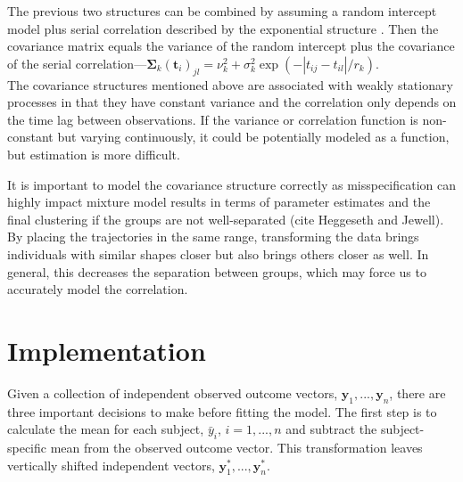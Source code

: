 \documentclass[12pt]{article}
\newcommand{\B}[0]{\mathbf}
\begin{document}
The previous two structures can be combined by assuming a random intercept model plus serial correlation described by the exponential structure \cite{diggle2002}. Then the covariance matrix equals the variance of the random intercept plus the covariance of the serial correlation---$\B \Sigma_{k}(\B t_{i})_{jl}=\nu^{2}_{k}+\sigma_{k}^{2}\exp(-| t_{ij}-t_{il}| / r_{k})$.\\

The covariance structures mentioned above are associated with weakly stationary processes in that they have constant variance and the correlation only depends on the time lag between observations. If the variance or correlation function is non-constant but varying continuously, it could be potentially modeled as a function, but estimation is more difficult.

It is important to model the covariance structure correctly as misspecification can highly impact mixture model results in terms of parameter estimates and the final clustering if the groups are not well-separated (cite Heggeseth and Jewell). By placing the trajectories in the same range, transforming the data brings individuals with similar shapes closer but also brings others closer as well. In general, this decreases the separation between groups, which may force us to accurately model the correlation. 

\section{Implementation}
Given a collection of independent observed outcome vectors, $\B y_{1},...,\B y_{n}$, there are three important decisions to make before fitting the model. The first step is to calculate the mean for each subject, $\bar{y}_{i}$, $i=1,...,n$ and subtract the subject-specific mean from the observed outcome vector. This transformation leaves vertically shifted independent vectors, $\B y^{*}_{1},...,\B y^{*}_{n}$.  
\end{document}
